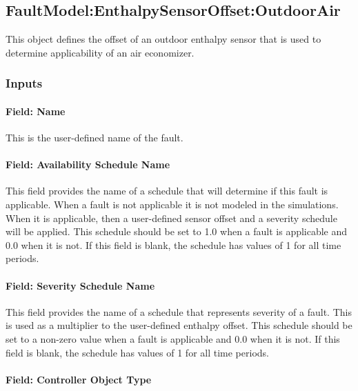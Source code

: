 \subsection{FaultModel:EnthalpySensorOffset:OutdoorAir}\label{faultmodelenthalpysensoroffsetoutdoorair}

This object defines the offset of an outdoor enthalpy sensor that is used to determine applicability of an air economizer.

\subsubsection{Inputs}\label{inputs-2-024}

\paragraph{Field: Name}\label{field-name-2-023}

This is the user-defined name of the fault.

\paragraph{Field: Availability Schedule Name}\label{field-availability-schedule-name-2-005}

This field provides the name of a schedule that will determine if this fault is applicable. When a fault is not applicable it is not modeled in the simulations. When it is applicable, then a user-defined sensor offset and a severity schedule will be applied. This schedule should be set to 1.0 when a fault is applicable and 0.0 when it is not. If this field is blank, the schedule has values of 1 for all time periods.

\paragraph{Field: Severity Schedule Name}\label{field-severity-schedule-name-2}

This field provides the name of a schedule that represents severity of a fault. This is used as a multiplier to the user-defined enthalpy offset. This schedule should be set to a non-zero value when a fault is applicable and 0.0 when it is not. If this field is blank, the schedule has values of 1 for all time periods.

\paragraph{Field: Controller Object Type}\label{field-controller-object-type-2}

